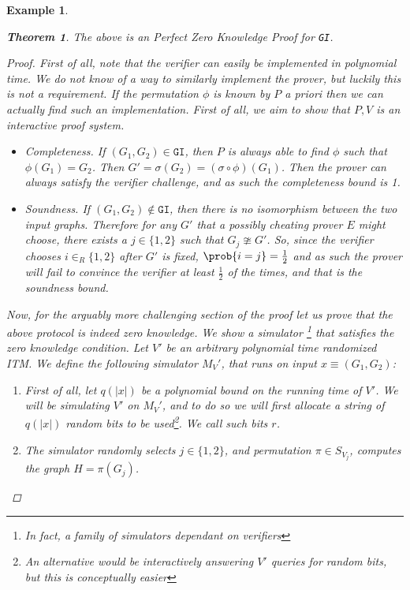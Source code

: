 \documentclass{article}
\newtheorem{theorem}{Theorem}
\newtheorem{example}{Example}
\begin{document}
\begin{example}
    \begin{theorem}
        The above is an Perfect Zero Knowledge Proof for \texttt{GI}.
    \end{theorem}
    \begin{proof}
        First of all, note that the verifier can easily be implemented in polynomial time. We do not know of a way to similarly implement the prover,
        but luckily this is not a requirement. If the permutation $\phi$ is known by $P$ a priori then we can actually find such an implementation.
        First of all, we aim to show that $P, V$ is an interactive proof system.
        \begin{itemize}
            \item Completeness. If $(G_1, G_2) \in \texttt{GI}$, then $P$ is always able to find $\phi$ such that
                  $\phi(G_1) = G_2$. Then $G' = \sigma(G_2) = (\sigma \circ \phi) (G_1)$. Then the prover can always satisfy the verifier challenge,
                  and as such the completeness bound is 1.
            \item Soundness. If $(G_1, G_2) \notin \texttt{GI}$, then there is no isomorphism between the two input graphs. Therefore for any $G'$ that a 
                    possibly cheating prover $E$ might choose, there exists a $j \in \{1, 2\}$ such that $G_j \ncong G'$. So, since the verifier chooses $i \in_R \{1, 2\}$ after $G'$ is fixed, $\prob{i = j} = \frac{1}{2}$ and as such the prover will fail to convince the verifier 
                    at least $\frac{1}{2}$ of the times, and that is the soundness bound.
        \end{itemize}
        Now, for the arguably more challenging section of the proof let us prove that the above protocol is indeed zero knowledge.
        We show a simulator \footnote{In fact, a family of simulators dependant on verifiers} that satisfies the zero knowledge condition. 
        Let $V'$ be an arbitrary polynomial time randomized ITM. We define the following simulator $M_V'$, that runs on input $x \equiv (G_1, G_2)$:
        \begin{enumerate}
            \item First of all, let $q(|x|)$ be a polynomial bound on the running time of $V'$. We will be simulating $V'$ on $M_V'$, and to do so we will first allocate a string of $q(|x|)$ random bits to be used\footnote{An alternative would be interactively answering $V'$ queries for random bits, but this is conceptually easier}. We call such bits $r$. 
            \item The simulator randomly selects $j \in \{1, 2 \}$, and permutation $\pi \in S_{V_j}$, computes the graph $H = \pi(G_j)$. 

\end{enumerate}
\end{proof}
\end{example}
\end{document}
